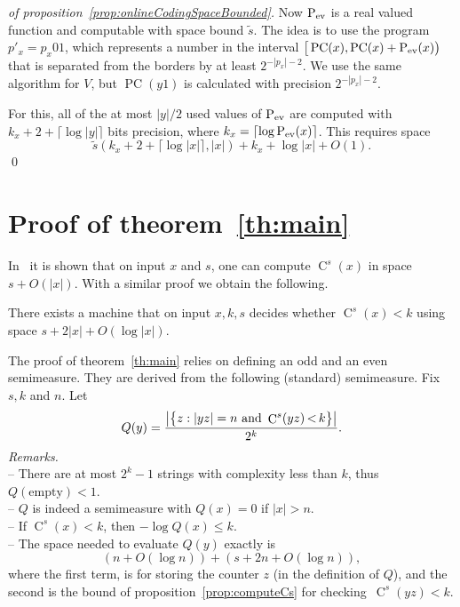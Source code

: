 \documentclass[runningheads]{llncs}
\DeclareMathOperator{\C}{C} \newcommand{\Cev}{\C_\textnormal{ev}} \newcommand{\Codd}{\C_\textnormal{odd}}
\DeclareMathOperator{\Pev}{P_{\textnormal{ev}}} \DeclareMathOperator{\Podd}{P_{\textnormal{odd}}} \DeclareMathOperator{\Pc}{PC}
\begin{document}
\begin{proof}[of proposition~\ref{prop:onlineCodingSpaceBounded}]
  Now $\Pev$ is a real valued function and computable with space bound $\tilde s$. 
  The idea is to use the program $p'_x = p_x01$, which represents a number in the interval $\big[\Pc(x), \Pc(x)+\Pev(x)\big)$ that is separated from the borders by at least $2^{-|p_x|-2}$.  
  We use the same algorithm for $V$, but $\Pc(y1)$ is calculated with precision $2^{-|p_x|-2}$. 

  For this, all of the at most $|y|/2$ used values of $\Pev$ are computed with $k_x + 2 + \lceil \log |y|\rceil$ bits precision, where $k_x = \lceil \log \Pev(x) \rceil$. 
  This requires space  
  \[
    \tilde s(k_x + 2 + \lceil \log |x|\rceil, |x|) + k_x + \log |x| + O(1). 
  \]
  \qed
\end{proof}




\section{Proof of theorem~\ref{th:main}}


In~\cite[lemma 3]{Bauwens2022Inequalities} it is shown that on input $x$ and $s$, one can compute $\C^s(x)$ in space $s + O(|x|)$. 
With a similar proof we obtain the following. 

\begin{proposition}\label{prop:computeCs}
  There exists a machine that on input $x,k,s$ decides whether $\C^s(x) < k$ using space $s+2|x|+O(\log |x|)$.  
\end{proposition}


\noindent
The proof of  theorem~\ref{th:main} relies on defining an odd and an even semimeasure. They are derived from the following (standard) semimeasure. Fix $s,k$ and $n$. Let
\[
  Q(y) = \frac {\big|\big\{z : |yz| = n \textnormal{ and } \C^s(yz) \mathop< k \big\}\big|} {2^{k}} .
\]
{\em Remarks.} 
\\-- There are at most $2^k-1$ strings with complexity less than $k$, thus $Q(\text{empty}) < 1$. 
\\-- $Q$ is indeed a semimeasure with $Q(x) = 0$ if $|x| > n$. 
\\-- If $\C^s(x) < k$, then $-\log Q(x) \le k$. 
\\-- The space needed to evaluate $Q(y)$ exactly is 
\[
  (n + O(\log n)) + (s + 2n + O(\log n)), 
\]
where the first term, is for storing the counter $z$ (in the definition of $Q$), 
and the second is the bound of proposition~\ref{prop:computeCs} for checking~$\C^s(yz)<k$.  
\end{document}
